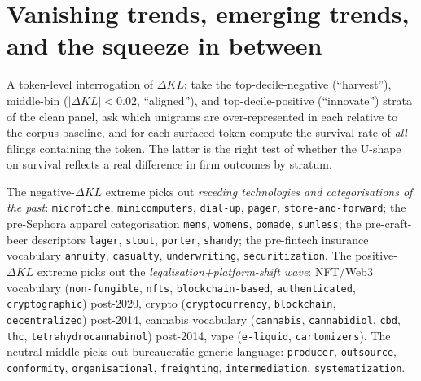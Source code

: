 \documentclass[11pt]{article}
\begin{document}
\section{Vanishing trends, emerging trends, and the squeeze in between}
\label{sec:flux-tokens}

A token-level interrogation of $\Delta KL$: take the
top-decile-negative (``harvest''), middle-bin ($|\Delta KL| < 0.02$,
``aligned''), and top-decile-positive (``innovate'') strata of the
clean panel, ask which unigrams are over-represented in each relative
to the corpus baseline, and for each surfaced token compute the
survival rate of \emph{all} filings containing the token. The latter
is the right test of whether the U-shape on survival reflects a real
difference in firm outcomes by stratum.

\begin{table}[h]
\centering
\caption{Tokens over-represented at the negative, neutral, and
positive extremes of $\Delta\mathrm{KL}$. Each cell: token followed by
survival rate across \emph{all} filings containing the token, with
enrichment lift in parentheses. Top 15 per stratum, ranked by lift;
minimum token popularity 2{,}000 filings.}
\label{tab:symmetric-flux-tokens}
\small

\end{table}

The negative-$\Delta KL$ extreme picks out \emph{receding technologies
and categorisations of the past}: \texttt{microfiche},
\texttt{minicomputers}, \texttt{dial-up}, \texttt{pager},
\texttt{store-and-forward}; the pre-Sephora apparel categorisation
\texttt{mens}, \texttt{womens}, \texttt{pomade}, \texttt{sunless};
the pre-craft-beer descriptors \texttt{lager}, \texttt{stout},
\texttt{porter}, \texttt{shandy}; the pre-fintech insurance vocabulary
\texttt{annuity}, \texttt{casualty}, \texttt{underwriting},
\texttt{securitization}. The positive-$\Delta KL$ extreme picks out
the \emph{legalisation+platform-shift wave}: NFT/Web3 vocabulary
(\texttt{non-fungible}, \texttt{nfts}, \texttt{blockchain-based},
\texttt{authenticated}, \texttt{cryptographic}) post-2020, crypto
(\texttt{cryptocurrency}, \texttt{blockchain}, \texttt{decentralized})
post-2014, cannabis vocabulary (\texttt{cannabis},
\texttt{cannabidiol}, \texttt{cbd}, \texttt{thc},
\texttt{tetrahydrocannabinol}) post-2014, vape (\texttt{e-liquid},
\texttt{cartomizers}). The neutral middle picks out bureaucratic
generic language: \texttt{producer}, \texttt{outsource},
\texttt{conformity}, \texttt{organisational}, \texttt{freighting},
\texttt{intermediation}, \texttt{systematization}.
\end{document}
